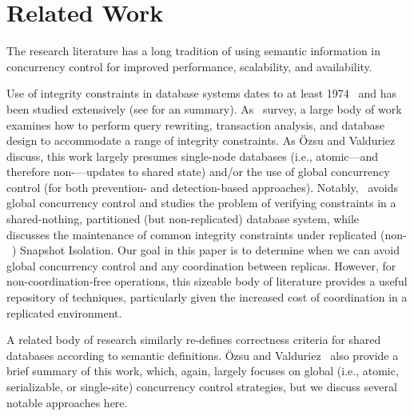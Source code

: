 
\section{Related Work}
\label{sec:relatedwork}

The research literature has a long tradition of using semantic
information in concurrency control for improved performance,
scalability, and availability.


 Use of integrity constraints in
database systems dates to at least 1974~\cite{florentin-constraints}
and has been studied extensively (see \cite{tamer-book} for an
summary). As~\cite{ic-survey,ic-survey-two} survey, a large body of
work examines how to perform query rewriting, transaction analysis,
and database design to accommodate a range of integrity
constraints. As \"{O}zsu and Valduriez~\cite{tamer-book} discuss, this
work largely presumes single-node databases (i.e., atomic---and
therefore non-\cfree---updates to shared state) and/or the use of
global concurrency control (for both prevention- and detection-based
approaches). Notably,~\cite{local-verification} avoids global
concurrency control and studies the problem of verifying constraints
in a shared-nothing, partitioned (but non-replicated) database system,
while~\cite{kemme-si-ic} discusses the maintenance of common integrity
constraints under replicated (non-\cfree~\cite{hat-vldb}) Snapshot
Isolation. Our goal in this paper is to determine when we can avoid
global concurrency control and any coordination between
replicas. However, for non-coordination-free operations, this sizeable
body of literature provides a useful repository of techniques,
particularly given the increased cost of coordination in a replicated
environment.


 A related body of
research similarly re-defines correctness criteria for shared
databases according to semantic definitions. \"{O}zsu and
Valduriez~\cite{tamer-book} also provide a brief summary of this work,
which, again, largely focuses on global (i.e., atomic, serializable,
or single-site) concurrency control strategies, but we discuss several
notable approaches here.

